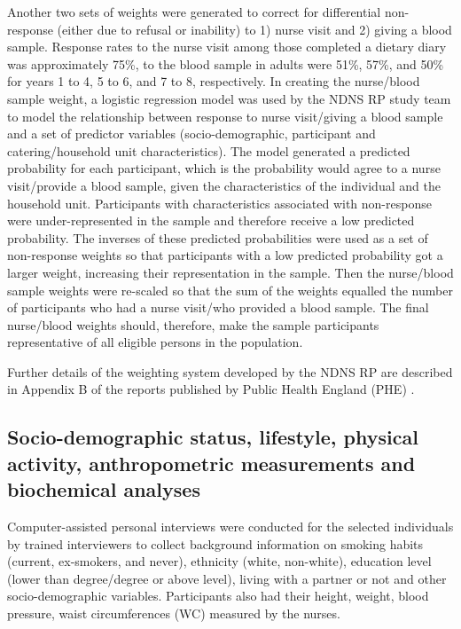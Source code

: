 Another two sets of weights were generated to correct for differential non-response (either due to refusal or inability) to 1) nurse visit and 2) giving a blood sample. Response rates to the nurse visit among those completed a dietary diary was approximately 75\%, to the blood sample in adults were 51\%, 57\%, and 50\% for years 1 to 4, 5 to 6, and 7 to 8, respectively. In creating the nurse/blood sample weight, a logistic regression model was used by the NDNS RP study team to model the relationship between response to nurse visit/giving a blood sample and a set of predictor variables (socio-demographic, participant and catering/household unit characteristics). The model generated a predicted probability for each participant, which is the probability would agree to a nurse visit/provide a blood sample, given the characteristics of the individual and the household unit. Participants with characteristics associated with non-response were under-represented in the sample and therefore receive a low predicted probability. The inverses of these predicted probabilities were used as a set of non-response weights so that participants with a low predicted probability got a larger weight, increasing their representation in the sample. Then the nurse/blood sample weights were re-scaled so that the sum of the weights equalled the number of participants who had a nurse visit/who provided a blood sample. The final nurse/blood weights should, therefore, make the sample participants representative of all eligible persons in the population. 

Further details of the weighting system developed by the NDNS RP are described in Appendix B of the reports published by Public Health England (PHE) \parencite{bates2014national,roberts2018national,NDNSofficial}.\vspace{-0.6cm}

\subsection{Socio-demographic status, lifestyle, physical activity, anthropometric measurements and biochemical analyses}\vspace{-0.3cm}

Computer-assisted personal interviews were conducted for the selected individuals by trained interviewers to collect background information on smoking habits (current, ex-smokers, and never), ethnicity (white, non-white), education level (lower than degree/degree or above level), living with a partner or not and other socio-demographic variables. Participants also had their height, weight, blood pressure, waist circumferences (WC) measured by the nurses. 

